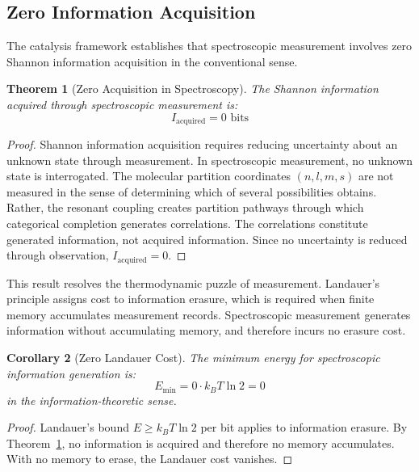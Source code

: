 \documentclass[twocolumn,10pt,a4paper]{article}
\newtheorem{theorem}{Theorem}[section]
\newtheorem{corollary}[theorem]{Corollary}
\theoremstyle{definition}
\theoremstyle{remark}
\begin{document}
\subsection{Zero Information Acquisition}

The catalysis framework establishes that spectroscopic measurement involves zero Shannon information acquisition in the conventional sense.

\begin{theorem}[Zero Acquisition in Spectroscopy]
\label{thm:zero_acquisition}
The Shannon information acquired through spectroscopic measurement is:
\begin{equation}
I_{\mathrm{acquired}} = 0 \text{ bits}
\end{equation}
\end{theorem}

\begin{proof}
Shannon information acquisition requires reducing uncertainty about an unknown state through measurement. In spectroscopic measurement, no unknown state is interrogated. The molecular partition coordinates $(n, l, m, s)$ are not measured in the sense of determining which of several possibilities obtains. Rather, the resonant coupling creates partition pathways through which categorical completion generates correlations. The correlations constitute generated information, not acquired information. Since no uncertainty is reduced through observation, $I_{\mathrm{acquired}} = 0$.
\end{proof}

This result resolves the thermodynamic puzzle of measurement. Landauer's principle assigns cost to information erasure, which is required when finite memory accumulates measurement records. Spectroscopic measurement generates information without accumulating memory, and therefore incurs no erasure cost.

\begin{corollary}[Zero Landauer Cost]
\label{cor:zero_landauer}
The minimum energy for spectroscopic information generation is:
\begin{equation}
E_{\mathrm{min}} = 0 \cdot k_B T \ln 2 = 0
\end{equation}
in the information-theoretic sense.
\end{corollary}

\begin{proof}
Landauer's bound $E \geq k_B T \ln 2$ per bit applies to information erasure. By Theorem~\ref{thm:zero_acquisition}, no information is acquired and therefore no memory accumulates. With no memory to erase, the Landauer cost vanishes.
\end{proof}
\end{document}
